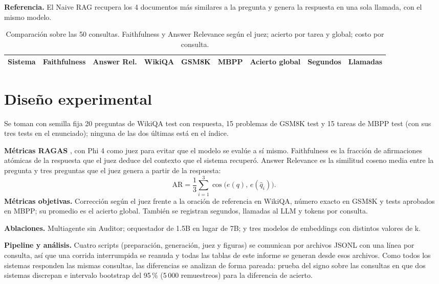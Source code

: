 \documentclass[10pt,a4paper,twocolumn]{article}
\begin{document}
\textbf{Referencia.} El Naive RAG recupera los 4 documentos más similares a la pregunta y genera la respuesta en una sola llamada, con el mismo modelo.

\begin{table}[t]
\centering
\caption{Comparación sobre las 50 consultas. Faithfulness y Answer Relevance según el juez; acierto por tarea y global; costo por consulta.}
\label{tab:principal}
\small
\begin{tabular}{lcccccccc}
\toprule
Sistema & Faithfulness & Answer Rel. & WikiQA & GSM8K & MBPP & Acierto global & Segundos & Llamadas \\
\midrule

\end{tabular}
\end{table}

\section{Diseño experimental}
Se toman con semilla fija 20 preguntas de WikiQA test con respuesta, 15 problemas de GSM8K test y 15 tareas de MBPP test (con sus tres tests en el enunciado); ninguna de las dos últimas está en el índice.

\textbf{Métricas RAGAS} \cite{es2023ragas}, con Phi 4 \cite{abdin2024phi4} como juez para evitar que el modelo se evalúe a sí mismo. Faithfulness es la fracción de afirmaciones atómicas de la respuesta que el juez deduce del contexto que el sistema recuperó. Answer Relevance es la similitud coseno media entre la pregunta y tres preguntas que el juez genera a partir de la respuesta:
\begin{equation}
\mathrm{AR} = \frac{1}{3}\sum_{i=1}^{3} \cos\big(e(q),\, e(\hat q_i)\big).
\end{equation}
\textbf{Métricas objetivas.} Corrección según el juez frente a la oración de referencia en WikiQA, número exacto en GSM8K y tests aprobados en MBPP; su promedio es el acierto global. También se registran segundos, llamadas al LLM y tokens por consulta.

\textbf{Ablaciones.} Multiagente sin Auditor; orquestador de 1.5B en lugar de 7B; y tres modelos de embeddings con distintos valores de k.

\textbf{Pipeline y análisis.} Cuatro scripts (preparación, generación, juez y figuras) se comunican por archivos JSONL con una línea por consulta, así que una corrida interrumpida se reanuda y todas las tablas de este informe se generan desde esos archivos. Como todos los sistemas responden las mismas consultas, las diferencias se analizan de forma pareada: prueba del signo sobre las consultas en que dos sistemas discrepan e intervalo bootstrap del 95\,\% (5\,000 remuestreos) para la diferencia de acierto.
\end{document}
